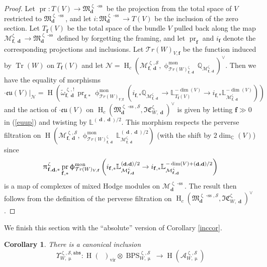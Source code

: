 \documentclass[a4paper,10pt]{amsart}
\renewcommand{\zeta}{\upzeta}
\renewcommand{\pi}{\uppi\hspace{0.05em}}
\renewcommand{\phi}{\upphi}
\renewcommand{\mu}{\upmu}
\newtheorem{corollary}[theorem]{Corollary}
\newcommand{\ab}{\mathtt{abs}}
\DeclareMathOperator{\BC}{B\mathbb{C}^*}
\newcommand{\eu}{\mathfrak{eu}}
\newcommand{\ff}{\mathbf{f}}
\newcommand{\LL}{\mathbb{L}}
\newcommand{\QQ}{\mathbb{Q}}
\newcommand{\SP}{\mathcal{S}}
\newcommand{\WW}{\mathcal{T}r(W)}
\newcommand{\Mst}{\mathfrak{M}}
\newcommand{\Msp}{\mathcal{M}}
\newcommand{\ICSt}{\mathfrak{IC}}
\newcommand{\phim}[1]{\phi^{\mon}_{#1}}
\DeclareMathOperator{\sst}{-ss}
\DeclareMathOperator{\mon}{mon}
\DeclareMathOperator{\dd}{\mathbf{d}}
\DeclareMathOperator{\DT}{BPS}
\DeclareMathOperator{\Tr}{Tr}
\DeclareMathOperator{\vir}{vir}
\DeclareMathOperator{\HO}{H}
\DeclareMathOperator{\pr}{pr}
\begin{document}
\begin{proof}
Let $\pr\colon T(V)\rightarrow \Mst^{\zeta\sst}_{\dd}$ be the projection from the total space of $V$ restricted to $\Mst^{\zeta\sst}_{\dd}$, and let $i\colon \Mst^{\zeta\sst}_{\dd}\rightarrow T(V)$ be the inclusion of the zero section.  Let $T_\ff(V)$ be the total space of the bundle $V$ pulled back along the map $\Msp_{\ff,\dd }^{\zeta}\rightarrow\Mst_{\dd}^{\zeta\sst}$ defined by forgetting the framing, and let $\pr_{\ff}$ and $i_{\ff}$ denote the corresponding projections and inclusions.  Let $\WW_{V,\ff}$ be the function induced by $\Tr(W)$ on $T_{\ff}(V)$ and let $\mathcal{N}=\HO_c(\Msp_{\ff,\dd }^{\zeta,\SP},\phim{\WW_{\ff,\dd}^{\zeta}}\QQ_{\Msp_{\ff,\dd}^{\zeta}})^{\vee}$.  Then we have the equality of morphisms
\begin{equation}
\label{euup}
\cdot \eu(V)|_{\mathcal{N}}=\HO\left(\tilde{\omega}_{\ff,\dd}^{\zeta,!}\pr_{\ff,*}\phim{\WW_{V,\ff}}\left(i_{\ff,*}\mathbb{Q}_{\Msp^{\zeta}_{\ff,\dd }}\rightarrow \LL^{-\dim(V)}_{T_{\ff}(V)}\rightarrow  i_{\ff,*}\LL^{-\dim(V)}_{\Msp^{\zeta}_{\ff,\dd }}\right)\right)
\end{equation}
and the action of $\cdot\eu(V)$ on $\HO_c(\Mst^{\zeta\sst,\SP}_{\dd},\ICSt_{W,\dd}^{\zeta})^{\vee}$ is given by letting $\ff\gg 0$ in (\ref{euup}) and twisting by $\LL^{(\dd,\dd)/2}$.  This morphism respects the perverse filtration on $\HO(\Msp^{\zeta,\SP}_{\ff,\dd },\phim{\WW_{\ff,\dd}^{\zeta}}\LL^{(\dd,\dd)/2}_{\Msp^{\zeta}_{\ff,\dd }})$ (with the shift by $2\dim_{\mathbb{C}}(V)$) since 
\[
\pi^{\zeta} _{\ff,\dd ,*}\pr_{\ff,*}\phim{\WW_{V,\ff}}\left(i_{\ff,*}\LL^{(\dd,\dd)/2}_{\Msp^{\zeta}_{\ff,\dd }}\rightarrow i_{\ff,*}\LL^{-\dim(V)+(\dd,\dd)/2}_{\Msp^{\zeta}_{\ff,\dd }}\right)
\]
is a map of complexes of mixed Hodge modules on $\Msp^{\zeta\sst}_{\dd}$.  The result then follows from the definition of the perverse filtration on $\HO_c(\Mst^{\zeta\sst,\SP}_{\dd},\ICSt_{W,\dd}^{\zeta})^{\vee}$.
\end{proof}
We finish this section with the ``absolute'' version of Corollary \ref{inccor}.
\begin{corollary}
\label{Inccor}
There is a canonical inclusion 
\begin{equation}
\label{caninc2}
\Upsilon_{W,\mu}^{\zeta,\SP,\ab}\colon\HO(\BC)_{\vir}\otimes \DT^{\zeta,\SP}_{W,\mu}\rightarrow \HO\left(\mathcal{A}^{\zeta,\SP}_{W,\mu}\right)
\end{equation}
\end{corollary}
\end{document}

